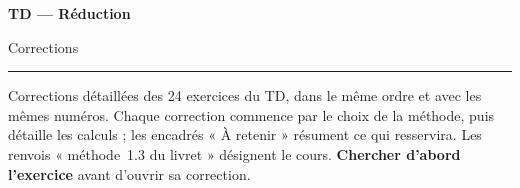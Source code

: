 \documentclass[a4paper,11pt]{article}
\numberwithin{equation}{section}
\numberwithin{figure}{section}
\numberwithin{table}{section}
\theoremstyle{enonce}
\theoremstyle{exemple}
\theoremstyle{remarque}
\begin{document}
\thispagestyle{plain}
{\sffamily\small\color{Gris}}\par\vspace{0.2em}
{\sffamily\bfseries\fontsize{26}{30}\selectfont\color{Ink}TD --- Réduction}\par\vspace{0.3em}
{\sffamily\Large\color{BleuMoyen}Corrections}\par\vspace{0.4em}
{\color{Ocre}\rule{3.2cm}{1.4pt}}\par\vspace{0.8em}
{\small Corrections détaillées des 24 exercices du TD, dans le même ordre et avec les mêmes numéros.
Chaque correction commence par le choix de la méthode, puis détaille les calculs ; les encadrés « À retenir » résument ce qui
resservira. Les renvois « méthode~1.3 du livret » désignent le cours.
\textbf{Chercher d'abord l'exercice} avant d'ouvrir sa correction.}
\end{document}
